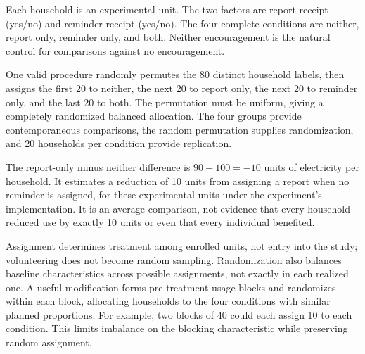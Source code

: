 \documentclass[11pt]{article}
\begin{document}
\begin{parts}
\item Each household is an experimental unit. The two factors are report receipt (yes/no) and reminder receipt (yes/no). The four complete conditions are neither, report only, reminder only, and both. Neither encouragement is the natural control for comparisons against no encouragement.
\item One valid procedure randomly permutes the 80 distinct household labels, then assigns the first 20 to neither, the next 20 to report only, the next 20 to reminder only, and the last 20 to both. The permutation must be uniform, giving a completely randomized balanced allocation. The four groups provide contemporaneous comparisons, the random permutation supplies randomization, and 20 households per condition provide replication.
\item The report-only minus neither difference is $90-100=-10$ units of electricity per household. It estimates a reduction of 10 units from assigning a report when no reminder is assigned, for these experimental units under the experiment's implementation. It is an average comparison, not evidence that every household reduced use by exactly 10 units or even that every individual benefited.
\item Assignment determines treatment among enrolled units, not entry into the study; volunteering does not become random sampling. Randomization also balances baseline characteristics across possible assignments, not exactly in each realized one. A useful modification forms pre-treatment usage blocks and randomizes within each block, allocating households to the four conditions with similar planned proportions. For example, two blocks of 40 could each assign 10 to each condition. This limits imbalance on the blocking characteristic while preserving random assignment.
\end{parts}
\end{document}
